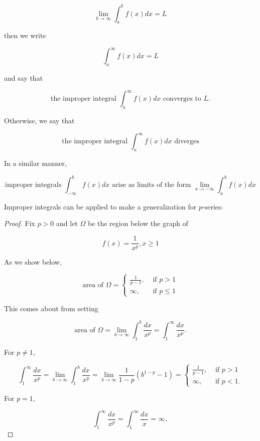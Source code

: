         \[
            \lim_{b\to\infty} \int_a^b f(x)dx = L
        \]

        then we write

        \[
            \int_a^{\infty} f(x)dx = L
        \]

        and say that

        \[
            \text{the improper integral } \int_a^{\infty} f(x)dx \text{ converges to } L.
        \]

        Otherwise, we say that

        \[
            \text{the improper integral } \int_a^{\infty} f(x)dx \text{ diverges}
        \]

        In a similar manner,

        \[
            \text{improper integrals } \int_{-\infty}^b f(x)dx \text{ arise as limits of the form } \lim_{a\to -\infty}\int_a^b f(x)dx
        \]

        Improper integrals can be applied to make a generalization for $p$-series:

        \begin{proof}
            Fix $p > 0$ and let $\Omega$ be the region below the graph of

            \[
                f(x) = \frac{1}{x^p}, x \geq 1
            \]

            As we show below,

            \[
                \text{area of }\Omega =
                \begin{cases}
                    \frac{1}{p-1},  & \text{ if } p > 1 \\
                    \infty,         & \text{ if } p \leq 1
                \end{cases}
            \]

            This comes about from setting

            \[
                \text{area of }\Omega = \lim_{b\to\infty} \int_1^b \frac{dx}{x^p} = \int_1^{\infty} \frac{dx}{x^p}.
            \]

            For $p\not = 1$,

            \[
                \int_1^{\infty} \frac{dx}{x^p} = \lim_{b\to\infty} \int_1^b \frac{dx}{x^p} = \lim_{b\to\infty} \frac{1}{1-p} (b^{1-p} - 1) =
                \begin{cases}
                    \frac{1}{p-1},  & \text{ if } p > 1 \\
                    \infty,         & \text{ if } p < 1.
                \end{cases}
            \]

            For $p = 1$,

            \[
                \int_1^{\infty} \frac{dx}{x^p} = \int_1^{\infty} \frac{dx}{x} = \infty,
            \]
        \end{proof}

